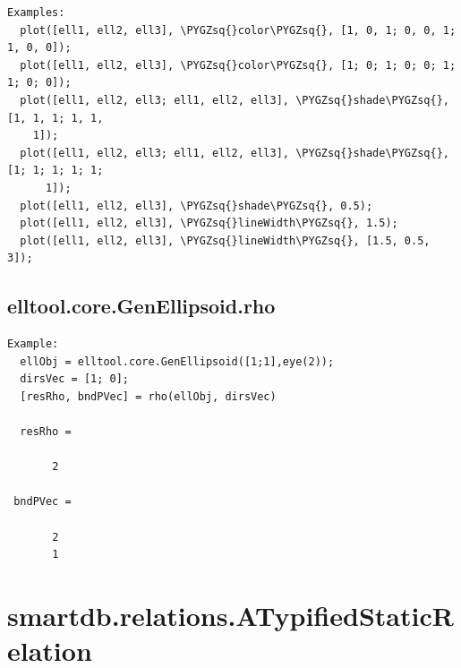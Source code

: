 \documentclass[letterpaper,10pt,english]{sphinxmanual}
\def\PYGZsq{\char`\'}
\begin{document}
\begin{Verbatim}[commandchars=\\\{\}]
Examples:
  plot([ell1, ell2, ell3], \PYGZsq{}color\PYGZsq{}, [1, 0, 1; 0, 0, 1; 1, 0, 0]);
  plot([ell1, ell2, ell3], \PYGZsq{}color\PYGZsq{}, [1; 0; 1; 0; 0; 1; 1; 0; 0]);
  plot([ell1, ell2, ell3; ell1, ell2, ell3], \PYGZsq{}shade\PYGZsq{}, [1, 1, 1; 1, 1,
    1]);
  plot([ell1, ell2, ell3; ell1, ell2, ell3], \PYGZsq{}shade\PYGZsq{}, [1; 1; 1; 1; 1;
      1]);
  plot([ell1, ell2, ell3], \PYGZsq{}shade\PYGZsq{}, 0.5);
  plot([ell1, ell2, ell3], \PYGZsq{}lineWidth\PYGZsq{}, 1.5);
  plot([ell1, ell2, ell3], \PYGZsq{}lineWidth\PYGZsq{}, [1.5, 0.5, 3]);
\end{Verbatim}


\subsection{elltool.core.GenEllipsoid.rho}
\label{chap_functions:elltool-core-genellipsoid-rho}
\begin{Verbatim}[commandchars=\\\{\}]
Example:
  ellObj = elltool.core.GenEllipsoid([1;1],eye(2));
  dirsVec = [1; 0];
  [resRho, bndPVec] = rho(ellObj, dirsVec)

  resRho =

       2

 bndPVec =

       2
       1
\end{Verbatim}


\section{smartdb.relations.ATypifiedStaticRelation}
\label{chap_functions:smartdb-relations-atypifiedstaticrelation}
\end{document}
